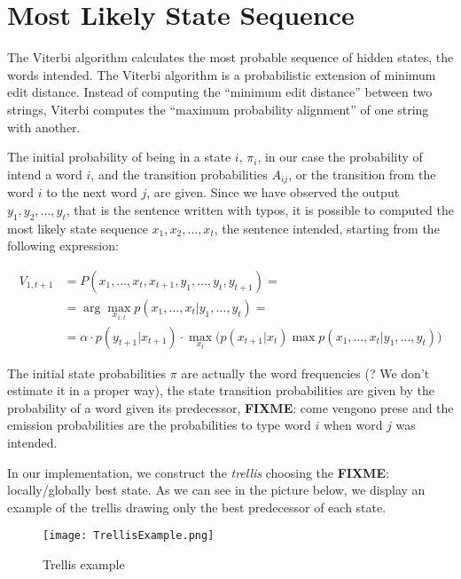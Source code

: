 \section{Most Likely State Sequence}

The Viterbi algorithm calculates the most probable sequence of hidden states, the words intended.
The Viterbi algorithm is a probabilistic extension of minimum edit distance. Instead of computing the “minimum 
edit distance” between two strings, Viterbi computes the “maximum probability alignment” of one string with 
another. 



The initial probability of being in a state $i$, $\pi_i$, in our case the probability of intend a word $i$, and the 
transition probabilities $A_{ij}$, or the transition from the word $i$ to the next word $j$, are given. Since we have 
observed the output $y_1, y_2, \dots , y_t$, that is the sentence written with typos, it is possible to computed the most 
likely state sequence $x_1, x_2, \dots , x_t$, the sentence intended, starting from the following expression:

\begin{equation}
	\begin{aligned}
		V_{1,t+1} &= P(x_1, \dots, x_t, x_{t+1}, y_1, \dots, y_t,  y_{t+1}) = \\
						&= \arg\max_{x_{1:t}} p(x_1, \dots, x_t | y_1, \dots, y_t) = \\
						& =  \alpha \cdot p(y_{t+1}|x_{t+1})\cdot\max_{x_t} \Big( p(x_{t+1}|x_t) \max p(x_1, \dots, x_{t}|y_1, 
						\dots, y_t)\Big)
	\end{aligned}
\end{equation}

The initial state probabilities $\pi$ are actually the word frequencies (? We don’t estimate it in a proper way), the state 
transition probabilities are given by the probability of a word given its predecessor, \textbf{FIXME}: {come vengono prese} 
and the emission probabilities are the probabilities to type word $i$ when word $j$ was intended.

In our implementation, we construct the \textit{trellis} choosing the \textbf{FIXME}: {locally/globally} best state. As we can 
see in the 
picture below, we display an example of the trellis drawing only the best predecessor of each state.

\begin{figure}[H]
	\centering
	\texttt{[image: TrellisExample.png]}
	\caption{Trellis example}
	\label{fig:trellis}
\end{figure}


